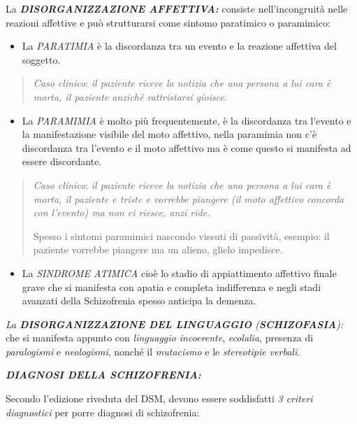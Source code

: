\documentclass[]{article}
\begin{document}
La \textbf{\emph{DISORGANIZZAZIONE AFFETTIVA:}} consiste
nell'incongruità nelle reazioni affettive e può strutturarsi come
sintomo paratimico o paramimico:

\begin{itemize}
\item
  La \emph{PARATIMIA} è la discordanza tra un evento e la reazione
  affettiva del soggetto.
\end{itemize}

\begin{quote}
\emph{Caso clinico}: \emph{il paziente riceve la notizia che una persona
a lui cara è morta, il paziente anziché rattristarsi gioisce}.
\end{quote}

\begin{itemize}
\item
  La \emph{PARAMIMIA} è molto più frequentemente, è la discordanza tra
  l'evento e la manifestazione visibile del moto affettivo, nella
  paramimia non c'è discordanza tra l'evento e il moto affettivo ma è
  come questo si manifesta ad essere discordante.
\end{itemize}

\begin{quote}
\emph{Caso clinico}: \emph{il paziente riceve la notizia che una persona
a lui cara è morta, il paziente e triste e vorrebbe piangere (il moto
affettivo concorda con l'evento) ma non ci riesce, anzi ride.}

Spesso i sintomi paramimici nascondo vissuti di passività, esempio: il
paziente vorrebbe piangere ma un alieno, glielo impedisce.
\end{quote}

\begin{itemize}
\item
  La \emph{SINDROME ATIMICA} cioè lo stadio di appiattimento affettivo
  finale grave che si manifesta con apatia e completa indifferenza e
  negli stadi avanzati della Schizofrenia spesso anticipa la demenza.
\end{itemize}

\emph{La \textbf{DISORGANIZZAZIONE DEL LINGUAGGIO}
(\textbf{SCHIZOFASIA}):} che si manifesta appunto con \emph{linguaggio
incoerente}, \emph{ecolalia}, presenza di \emph{paralogismi} e
\emph{neologismi}, nonché il \emph{mutacismo} e le \emph{stereotipie
verbali}.

\textbf{\emph{DIAGNOSI DELLA SCHIZOFRENIA:}}

Secondo l'edizione riveduta del DSM, devono essere soddisfatti \emph{3
criteri diagnostici} per porre diagnosi di schizofrenia:
\end{document}
